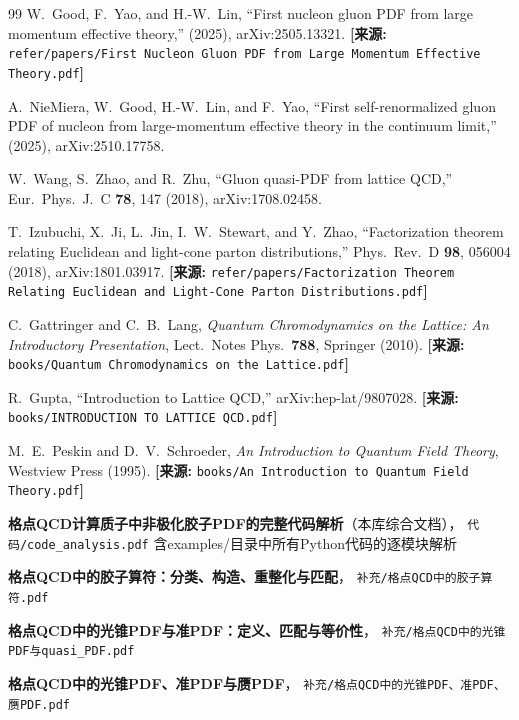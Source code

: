 \documentclass[12pt,a4paper]{ctexart}
\theoremstyle{definition}
\begin{document}
\begin{thebibliography}{99}
W.~Good, F.~Yao, and H.-W.~Lin,
``First nucleon gluon PDF from large momentum effective theory,''
(2025), arXiv:2505.13321.
\quad\textbf{[来源:} \texttt{refer/papers/First Nucleon Gluon PDF from Large Momentum Effective Theory.pdf}\textbf{]}

A.~NieMiera, W.~Good, H.-W.~Lin, and F.~Yao,
``First self-renormalized gluon PDF of nucleon from large-momentum effective theory in the continuum limit,''
(2025), arXiv:2510.17758.

W.~Wang, S.~Zhao, and R.~Zhu,
``Gluon quasi-PDF from lattice QCD,''
Eur.\ Phys.\ J.\ C \textbf{78}, 147 (2018), arXiv:1708.02458.

T.~Izubuchi, X.~Ji, L.~Jin, I.~W.~Stewart, and Y.~Zhao,
``Factorization theorem relating Euclidean and light-cone parton distributions,''
Phys.\ Rev.\ D \textbf{98}, 056004 (2018), arXiv:1801.03917.
\quad\textbf{[来源:} \texttt{refer/papers/Factorization Theorem Relating Euclidean and Light-Cone Parton Distributions.pdf}\textbf{]}

C.~Gattringer and C.~B.~Lang,
\textit{Quantum Chromodynamics on the Lattice: An Introductory Presentation},
Lect.\ Notes Phys.\ \textbf{788}, Springer (2010).
\quad\textbf{[来源:} \texttt{books/Quantum Chromodynamics on the Lattice.pdf}\textbf{]}

R.~Gupta,
``Introduction to Lattice QCD,''
arXiv:hep-lat/9807028.
\quad\textbf{[来源:} \texttt{books/INTRODUCTION TO LATTICE QCD.pdf}\textbf{]}

M.~E.~Peskin and D.~V.~Schroeder,
\textit{An Introduction to Quantum Field Theory},
Westview Press (1995).
\quad\textbf{[来源:} \texttt{books/An Introduction to Quantum Field Theory.pdf}\textbf{]}

\textbf{格点QCD计算质子中非极化胶子PDF的完整代码解析}（本库综合文档），
\texttt{代码/code\_analysis.pdf}
\quad 含examples/目录中所有Python代码的逐模块解析

\textbf{格点QCD中的胶子算符：分类、构造、重整化与匹配}，
\texttt{补充/格点QCD中的胶子算符.pdf}

\textbf{格点QCD中的光锥PDF与准PDF：定义、匹配与等价性}，
\texttt{补充/格点QCD中的光锥PDF与quasi\_PDF.pdf}

\textbf{格点QCD中的光锥PDF、准PDF与赝PDF}，
\texttt{补充/格点QCD中的光锥PDF、准PDF、赝PDF.pdf}


\end{thebibliography}
\end{document}
